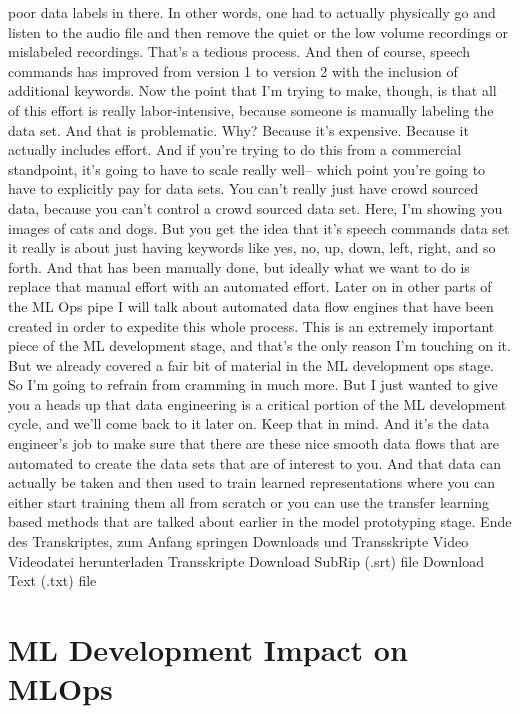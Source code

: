 {{    poor data labels in there.
    In other words, one had to actually physically
    go and listen to the audio file and then remove the quiet or the low volume
    recordings or mislabeled recordings.
    That's a tedious process.
    And then of course, speech commands has improved from version 1 to version 2
    with the inclusion of additional keywords.
    Now the point that I'm trying to make, though, is that all of this effort
    is really labor-intensive, because someone is manually
    labeling the data set.
    And that is problematic.
    Why?
    Because it's expensive.
    Because it actually includes effort.
    And if you're trying to do this from a commercial standpoint,
    it's going to have to scale really well--
    which point you're going to have to explicitly pay for data sets.
    You can't really just have crowd sourced data,
    because you can't control a crowd sourced data set.
    Here, I'm showing you images of cats and dogs.
    But you get the idea that it's speech commands
    data set it really is about just having keywords like yes, no, up,
    down, left, right, and so forth.
    And that has been manually done, but ideally what we want to do
    is replace that manual effort with an automated effort.
    Later on in other parts of the ML Ops pipe I will talk about automated data
    flow engines that have been created in order to expedite this whole process.
    This is an extremely important piece of the ML development stage,
    and that's the only reason I'm touching on it.
    But we already covered a fair bit of material
    in the ML development ops stage.
    So I'm going to refrain from cramming in much more.
    But I just wanted to give you a heads up that data engineering is
    a critical portion of the ML development cycle,
    and we'll come back to it later on.
    Keep that in mind.
    And it's the data engineer's job to make sure
    that there are these nice smooth data flows that
    are automated to create the data sets that are of interest to you.
    And that data can actually be taken and then
    used to train learned representations where you can either
    start training them all from scratch or you
    can use the transfer learning based methods
    that are talked about earlier in the model prototyping stage.
    Ende des Transkriptes, zum Anfang springen
    Downloads und Transskripte
    Video
    Videodatei herunterladen
    Transskripte
    Download SubRip (.srt) file
    Download Text (.txt) file    
        
\section{ML Development Impact on MLOps}


}}
